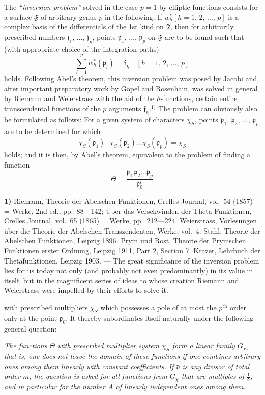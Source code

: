 \documentclass{article}
\begin{document}
The \emph{``inversion problem''} solved in the case $p = 1$ by elliptic functions consists for a surface $\mathfrak{F}$ of arbitrary genus $p$ in the following: If $w_h^* [h = 1, \, 2, \, \dots, \, p]$ is a complex basis of the differentials of the 1st kind on $\mathfrak{F}$, then for arbitrarily prescribed numbers $\mathfrak{f}_1, \, \dots, \, \mathfrak{f}_p$, points $\mathfrak{p}_1, \, \dots, \, \mathfrak{p}_p$ on $\mathfrak{F}$ are to be found such that (with appropriate choice of the integration paths)
\[ \sum_{l=1}^p w_h^*(\mathfrak{p}_l) = \mathfrak{f}_h \quad [h = 1, \, 2, \, \dots, \, p] \tag{45} \]
holds. Following Abel's theorem, this inversion problem was posed by Jacobi and, after important preparatory work by Göpel and Rosenhain, was solved in general by Riemann and Weierstrass with the aid of the $\vartheta$-functions, certain entire transcendental functions of the $p$ arguments $\mathfrak{f}_h$.${}^{1)}$ The problem can obviously also be formulated as follows: For a given system of characters $\chi_S$, points $\mathfrak{p}_1, \, \mathfrak{p}_2, \, \dots, \, \mathfrak{p}_p$ are to be determined for which
\[ \chi_S(\mathfrak{p}_1) \cdot \chi_S(\mathfrak{p}_2) \dots \chi_S(\mathfrak{p}_p) = \chi_S \tag{46} \]
holds; and it is then, by Abel's theorem, equivalent to the problem of finding a function
\[ \Theta = \frac{\mathfrak{p}_1 \, \mathfrak{p}_2 \dots \mathfrak{p}_p}{\mathfrak{p}_0^p} \]

\textbf{1)} Riemann, Theorie der Abelschen Funktionen, Crelles Journal, vol.~54 (1857) = Werke, 2nd ed., pp.~88---142; Über das Verschwinden der Theta-Funktionen, Crelles Journal, vol.~65 (1865) = Werke, pp.~212---224. Weierstrass, Vorlesungen über die Theorie der Abelschen Transzendenten, Werke, vol.~4. Stahl, Theorie der Abelschen Funktionen, Leipzig 1896. Prym und Rost, Theorie der Prymschen Funktionen erster Ordnung, Leipzig 1911, Part 2, Section 7. Krazer, Lehrbuch der Thetafunktionen, Leipzig 1903. --- The great significance of the inversion problem lies for us today not only (and probably not even predominantly) in its value in itself, but in the magnificent series of ideas to whose creation Riemann and Weierstrass were impelled by their efforts to solve it.

with prescribed multipliers $\chi_S$ which possesses a pole of at most the $p^{\text{th}}$ order only at the point $\mathfrak{p}_0$. It thereby subordinates itself naturally under the following general question:

\emph{The functions $\Theta$ with prescribed multiplier system $\chi_S$ form a linear family $G_\chi$, that is, one does not leave the domain of these functions if one combines arbitrary ones among them linearly with constant coefficients. If $\mathfrak{d}$ is any divisor of total order $m$, the question is asked for all functions from $G_\chi$ that are multiples of $\frac{1}{\mathfrak{d}}$, and in particular for the number $A$ of linearly independent ones among them.}
\end{document}
